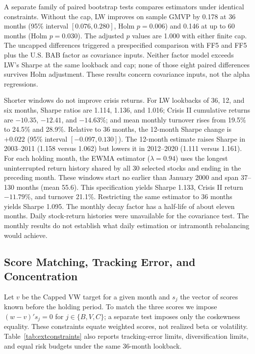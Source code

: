 \documentclass[letterpaper,journal]{IEEEtran}
\begin{document}
A separate family of paired bootstrap tests compares estimators under identical constraints. Without the cap, LW improves on sample GMVP by 0.178 at 36 months (95\% interval $[0.076,0.280]$, Holm $p=0.006$) and 0.146 at up to 60 months (Holm $p=0.030$). The adjusted $p$ values are 1.000 with either finite cap. The uncapped differences triggered a prespecified comparison with FF5 and FF5 plus the U.S. BAB factor as covariance inputs. Neither factor model exceeds LW's Sharpe at the same lookback and cap; none of those eight paired differences survives Holm adjustment. These results concern covariance inputs, not the alpha regressions.

Shorter windows do not improve crisis returns. For LW lookbacks of 36, 12, and six months, Sharpe ratios are 1.114, 1.136, and 1.016; Crisis II cumulative returns are $-10.35$, $-12.41$, and $-14.63\%$; and mean monthly turnover rises from 19.5\% to 24.5\% and 28.9\%. Relative to 36 months, the 12-month Sharpe change is $+0.022$ (95\% interval $[-0.097,0.130]$). The 12-month estimate raises Sharpe in 2003--2011 (1.158 versus 1.062) but lowers it in 2012--2020 (1.111 versus 1.161). For each holding month, the EWMA estimator ($\lambda=0.94$) uses the longest uninterrupted return history shared by all 30 selected stocks and ending in the preceding month. These windows start no earlier than January 2000 and span 37--130 months (mean 55.6). This specification yields Sharpe 1.133, Crisis II return $-11.79\%$, and turnover 21.1\%. Restricting the same estimator to 36 months yields Sharpe 1.095. The monthly decay factor has a half-life of about eleven months. Daily stock-return histories were unavailable for the covariance test. The monthly results do not establish what daily estimation or intramonth rebalancing would achieve.

\subsection{Score Matching, Tracking Error, and Concentration}
Let $v$ be the Capped VW target for a given month and $s_j$ the vector of scores known before the holding period. To match the three scores we impose $(w-v)'s_j=0$ for $j\in\{B,V,C\}$; a separate test imposes only the coskewness equality. These constraints equate weighted scores, not realized beta or volatility. Table~\ref{tab:extconstraints} also reports tracking-error limits, diversification limits, and equal risk budgets under the same 36-month lookback.
\end{document}
